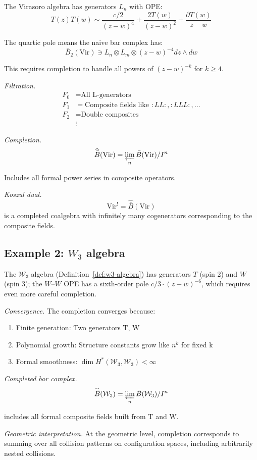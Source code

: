 \begin{example}\label{ex:virasoro-completion}
The Virasoro algebra has generators $L_n$ with OPE:
\[T(z)T(w) \sim \frac{c/2}{(z-w)^4} + \frac{2T(w)}{(z-w)^2} + \frac{\partial T(w)}{z-w}\]

The quartic pole means the naive bar complex has:
\[\bar{B}_2(\text{Vir}) \ni L_n \otimes L_m \otimes (z-w)^{-4} dz \wedge dw\]

This requires completion to handle all powers of $(z-w)^{-k}$ for $k \geq 4$.

\emph{Filtration.}
\begin{align*}
F_0 &= \text{All L-generators} \\
F_1 &= \text{Composite fields like } :LL:, :LLL:, \ldots \\
F_2 &= \text{Double composites} \\
&\vdots
\end{align*}

\emph{Completion.}
\[\widehat{\bar{B}}(\text{Vir}) = \varprojlim_n \bar{B}(\text{Vir})/I^n\]

Includes all formal power series in composite operators.

\emph{Koszul dual.}
\[\text{Vir}^! = \widehat{\bar{B}}(\text{Vir})\]
is a completed coalgebra with infinitely many cogenerators corresponding to the composite fields.
\end{example}

\subsection{\texorpdfstring{Example 2: $W_3$ algebra}{Example 2: W-3 algebra}}

\begin{example}\label{ex:w3-completion}
The $\mathcal{W}_3$ algebra (Definition~\ref{def:w3-algebra}) has generators $T$ (spin 2) and $W$ (spin 3); the $W$--$W$ OPE has a sixth-order pole $c/3 \cdot (z-w)^{-6}$, which requires even more careful completion.

\emph{Convergence.}
The completion converges because:
\begin{enumerate}
\item Finite generation: Two generators T, W
\item Polynomial growth: Structure constants grow like $n^k$ for fixed k
\item Formal smoothness: $\dim H^*(\mathcal{W}_3, \mathcal{W}_3) < \infty$
\end{enumerate}

\emph{Completed bar complex.}
\[\widehat{\bar{B}}(\mathcal{W}_3) = \varprojlim_{n} \bar{B}(\mathcal{W}_3)/I^n\]

includes all formal composite fields built from T and W.

\emph{Geometric interpretation.}
At the geometric level, completion corresponds to summing over all collision patterns on configuration spaces, including arbitrarily nested collisions.
\end{example}


